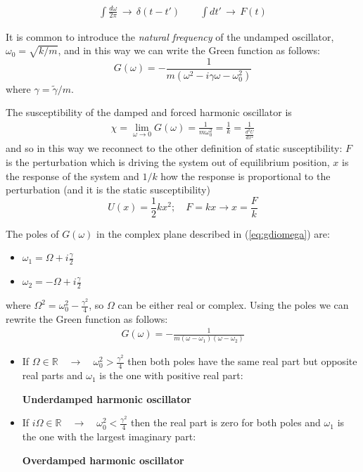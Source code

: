 \documentclass[\main/main.tex]{subfiles}
\begin{document}
\begin{eqnarray*}
\int \frac{d\omega}{2\pi} \, \to \, \delta(t-t') \qquad \int dt' \, \to \, F(t)
\end{eqnarray*}

It is common to introduce the \textit{natural frequency} of the undamped oscillator, $\omega_{0}=\sqrt{k / m}$, and in this way we can write the Green function as follows:
\begin{equation}
G(\omega)=-\frac{1}{m\left(\omega^{2}-i \gamma \omega-\omega_{0}^{2}\right)}
\label{eq:gdiomega}
\end{equation}
where $\gamma=\tilde{\gamma} / m$. 

\begin{appr}

The susceptibility of the damped and forced harmonic oscillator is
\begin{eqnarray*}
\chi=\lim _{\omega \rightarrow 0} G(\omega)=\frac{1}{m \omega_{0}^{2}}=\frac{1}{k}=\frac{1}{\frac{d^2 U}{d x^2}}
\end{eqnarray*}
and so in this way we reconnect to the other definition of static susceptibility: $F$ is the perturbation which is driving the system out of equilibrium position, $x$ is the response of the system and $1/k$ how the response is proportional to the perturbation (and it is the static susceptibility)
\[
U(x)=\frac{1}{2}k x^2; \quad F=kx\to x=\frac{F}{k}
\]

\end{appr}
 
The poles of $G(\omega)$ in the complex plane described in (\ref{eq:gdiomega}) are:
\begin{itemize}
    \item $\omega_1 = \Omega+i\frac{\gamma}{2}$
    \item $\omega_2 = - \Omega+i\frac{\gamma}{2}$
\end{itemize}
where $\Omega^2=\omega_0 ^2-\frac{\gamma^2}{4}$, so $\Omega$ can be either real or complex. Using the poles we can rewrite the Green function as follows:
\begin{eqnarray}
G(\omega)=-\frac{1}{m\left(\omega-\omega_{1}\right)\left(\omega-\omega_{2}\right)}
\end{eqnarray}

\begin{itemize}
    \item If $\Omega \in \mathbb{R} \quad \to \quad \omega_0^2>\frac{\gamma^2}{4}$ then both poles have the same real part but opposite real parts and $\omega_1$ is the one with positive real part:
    \begin{center}
      \textbf{Underdamped harmonic oscillator}
    \end{center}
     \item If $i\Omega \in \mathbb{R} \quad \to \quad \omega_0^2<\frac{\gamma^2}{4}$ then the real part is zero for both poles and $\omega_1$ is the one with the largest imaginary part:
     \begin{center}
     \textbf{Overdamped harmonic oscillator}
     \end{center}
\end{itemize}
\end{document}
